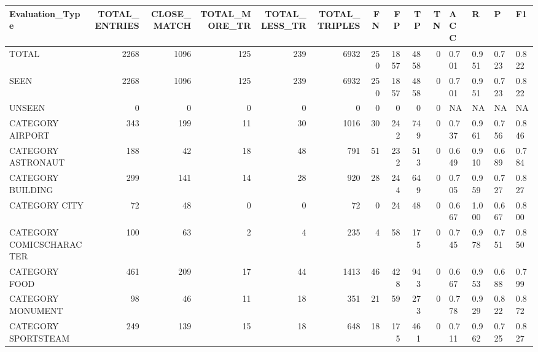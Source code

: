 \begin{tabular}{lrrrrrrrrrllll}
\hline
 Evaluation\_Type          &   TOTAL\_ENTRIES &   CLOSE\_MATCH &   TOTAL\_MORE\_TR &   TOTAL\_LESS\_TR &   TOTAL\_TRIPLES &   FN &   FP &   TP &   TN & ACC   & R     & P     & F1    \\
\hline
 TOTAL                    &            2268 &          1096 &             125 &             239 &            6932 &  250 & 1857 & 4858 &    0 & 0.701 & 0.951 & 0.723 & 0.822 \\
 SEEN                     &            2268 &          1096 &             125 &             239 &            6932 &  250 & 1857 & 4858 &    0 & 0.701 & 0.951 & 0.723 & 0.822 \\
 UNSEEN                   &               0 &             0 &               0 &               0 &               0 &    0 &    0 &    0 &    0 & NA    & NA    & NA    & NA    \\
 CATEGORY AIRPORT         &             343 &           199 &              11 &              30 &            1016 &   30 &  242 &  749 &    0 & 0.737 & 0.961 & 0.756 & 0.846 \\
 CATEGORY ASTRONAUT       &             188 &            42 &              18 &              48 &             791 &   51 &  232 &  513 &    0 & 0.649 & 0.910 & 0.689 & 0.784 \\
 CATEGORY BUILDING        &             299 &           141 &              14 &              28 &             920 &   28 &  244 &  649 &    0 & 0.705 & 0.959 & 0.727 & 0.827 \\
 CATEGORY CITY            &              72 &            48 &               0 &               0 &              72 &    0 &   24 &   48 &    0 & 0.667 & 1.000 & 0.667 & 0.800 \\
 CATEGORY COMICSCHARACTER &             100 &            63 &               2 &               4 &             235 &    4 &   58 &  175 &    0 & 0.745 & 0.978 & 0.751 & 0.850 \\
 CATEGORY FOOD            &             461 &           209 &              17 &              44 &            1413 &   46 &  428 &  943 &    0 & 0.667 & 0.953 & 0.688 & 0.799 \\
 CATEGORY MONUMENT        &              98 &            46 &              11 &              18 &             351 &   21 &   59 &  273 &    0 & 0.778 & 0.929 & 0.822 & 0.872 \\
 CATEGORY SPORTSTEAM      &             249 &           139 &              15 &              18 &             648 &   18 &  175 &  461 &    0 & 0.711 & 0.962 & 0.725 & 0.827 \\

\end{tabular}
